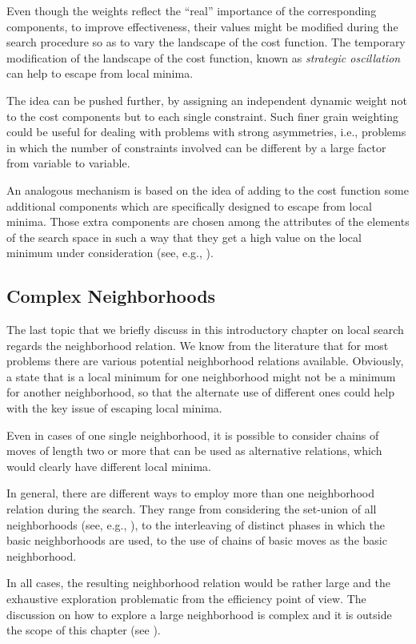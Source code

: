 Even though the weights reflect the ``real'' importance of the corresponding
components, to improve effectiveness, their values might be modified during
the search procedure so as to vary the landscape of the cost function. The
temporary modification of the landscape of the cost function, known as \emph{strategic oscillation} 
can help to escape from local minima. 

The idea can be pushed further, by assigning an independent dynamic
weight not to the cost components but to each single constraint.  Such
finer grain weighting could be useful for dealing with problems with
strong asymmetries, i.e., problems in which the number of constraints
involved can be different by a large factor from variable to variable.

An analogous mechanism is based on the idea of adding to the cost
function some additional components which are specifically designed to
escape from local minima. Those extra components are chosen among the
attributes of the elements of the search space in such a way that they
get a high value on the local minimum under
consideration (see, e.g., \cite{VoTA10}).



\subsection{Complex Neighborhoods}

The last topic that we briefly discuss in this introductory chapter on local search regards the neighborhood relation. We know from the literature that for most problems there are various potential neighborhood relations available. Obviously, a state that is a local minimum for one neighborhood might not be a minimum for another neighborhood, so that the alternate use of different ones could help with the key issue of escaping local minima.

Even in cases of one single neighborhood, it is possible to consider chains of moves of length two or more that can be used as alternative relations, which would clearly have different local minima. 

In general, there are different ways to employ more than one neighborhood relation during the search. They range from considering the set-union of all neighborhoods (see, e.g., \cite{BCDS21}), to the interleaving of distinct phases in which the basic neighborhoods are used, to the use of chains of basic moves as the basic neighborhood. 

In all cases, the resulting neighborhood relation would be rather large and the exhaustive exploration problematic from the efficiency point of view. The discussion on how to explore a large neighborhood is complex and it is outside the scope of this chapter (see \cite{AEOP02}). 

